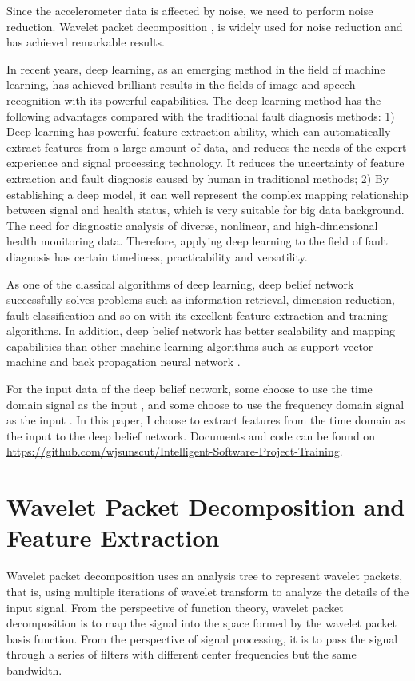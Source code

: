 \documentclass{bioinfo}
\begin{document}
Since the accelerometer data is affected by noise, we need to perform noise reduction. Wavelet packet decomposition \cite{Wang2015Detection}, \cite{Yongle2015Zero} is widely used for noise reduction and has achieved remarkable results.

In recent years, deep learning, as an emerging method in the field of machine learning, has achieved brilliant results in the fields of image and speech recognition with its powerful capabilities. The deep learning method has the following advantages compared with the traditional fault diagnosis methods: 1) Deep learning has powerful feature extraction ability, which can automatically extract features from a large amount of data, and reduces the needs of the expert experience and signal processing technology. It reduces the uncertainty of feature extraction and fault diagnosis caused by human in traditional methods; 2) By establishing a deep model, it can well represent the complex mapping relationship between signal and health status, which is very suitable for big data background. The need for diagnostic analysis of diverse, nonlinear, and high-dimensional health monitoring data. Therefore, applying deep learning to the field of fault diagnosis has certain timeliness, practicability and versatility.

As one of the classical algorithms of deep learning, deep belief network \cite{Hinton2012A} successfully solves problems such as information retrieval, dimension reduction, fault classification and so on with its excellent feature extraction and training algorithms. In addition, deep belief network has better scalability and mapping capabilities than other machine learning algorithms such as support vector machine \cite{vapnik1999overview} and back propagation neural network \cite{Kramer1990Diagnosis}.

For the input data of the deep belief network, some choose to use the time domain signal as the input \cite{guangquan2016fault}, and some choose to use the frequency domain signal as the input \cite{jia2016deep}. In this paper, I choose to extract features from the time domain \cite{YiThe} as the input to the deep belief network. Documents and code can be found on \href{https://github.com/wjsunscut/Intelligent-Software-Project-Training}{https://github.com/wjsunscut/Intelligent-Software-Project-Training}.

\section{Wavelet Packet Decomposition and Feature Extraction}
Wavelet packet decomposition uses an analysis tree to represent wavelet packets, that is, using multiple iterations of wavelet transform to analyze the details of the input signal. From the perspective of function theory, wavelet packet decomposition is to map the signal into the space formed by the wavelet packet basis function. From the perspective of signal processing, it is to pass the signal through a series of filters with different center frequencies but the same bandwidth.
\end{document}
